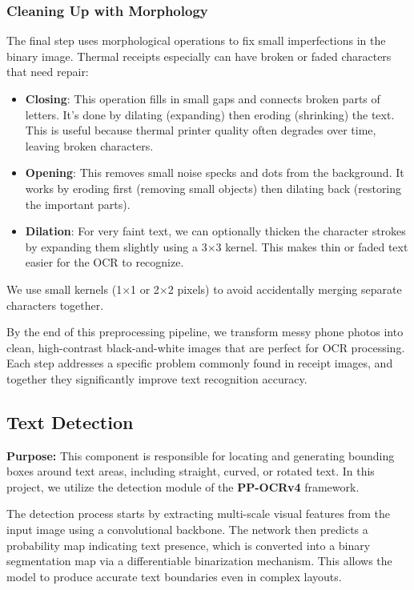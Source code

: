 \subsubsection{Cleaning Up with Morphology}

The final step uses morphological operations to fix small imperfections in the binary image. Thermal receipts especially can have broken or faded characters that need repair:

\begin{itemize}
    \item \textbf{Closing}: This operation fills in small gaps and connects broken parts of letters. It's done by dilating (expanding) then eroding (shrinking) the text. This is useful because thermal printer quality often degrades over time, leaving broken characters.

    \item \textbf{Opening}: This removes small noise specks and dots from the background. It works by eroding first (removing small objects) then dilating back (restoring the important parts).

    \item \textbf{Dilation}: For very faint text, we can optionally thicken the character strokes by expanding them slightly using a 3$\times$3 kernel. This makes thin or faded text easier for the OCR to recognize.
\end{itemize}

We use small kernels (1$\times$1 or 2$\times$2 pixels) to avoid accidentally merging separate characters together.

By the end of this preprocessing pipeline, we transform messy phone photos into clean, high-contrast black-and-white images that are perfect for OCR processing. Each step addresses a specific problem commonly found in receipt images, and together they significantly improve text recognition accuracy.

\subsection{Text Detection}
\textbf{Purpose:} This component is responsible for locating and generating bounding boxes around text areas, including straight, curved, or rotated text. In this project, we utilize the detection module of the \textbf{PP-OCRv4} framework.

\noindent The detection process starts by extracting multi-scale visual features from the input image using a convolutional backbone. The network then predicts a probability map indicating text presence, which is converted into a binary segmentation map via a differentiable binarization mechanism. This allows the model to produce accurate text boundaries even in complex layouts.

